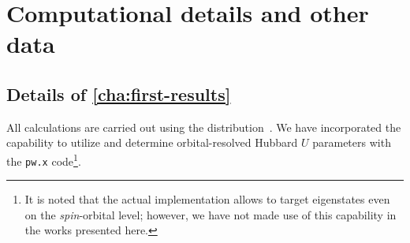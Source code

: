 \chapter{Computational details and other data}
\label{sec:comp-details}


\section[Details of Chap. 3]{Details of \cref{cha:first-results}}
    \label{sec:first-compdetails}
    All calculations are carried out using the \QE distribution~\cite{giannozziQUANTUM2009,giannozziAdvanced2017,giannozziQuantum2020}.
    We have incorporated the capability to utilize and determine orbital-resolved Hubbard $U$ parameters with the \texttt{pw.x} code\footnote{It is noted that the actual implementation allows to target eigenstates even on the \textit{spin}-orbital level; however, we have not made use of this capability in the works presented here.}.

